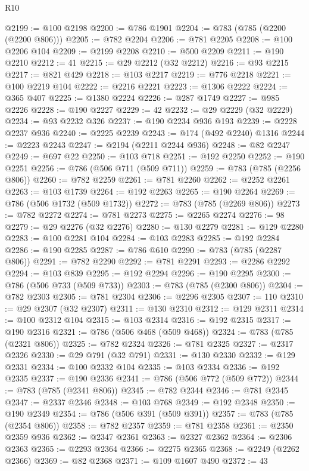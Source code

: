 \begin{lexlean}{R10}
\begin{coremodule}
@2199 := @100 @2198
@2200 := @786 @1901
@2204 := @783 (@785 (@2200 (@2200 @806)))
@2205 := @782 @2204
@2206 := @781 @2205
@2208 := @100 @2206 @104
@2209 := @2199 @2208
@2210 := @500 @2209
@2211 := @190 @2210
@2212 := 41
@2215 := @29 @2212 (@32 @2212)
@2216 := @93 @2215
@2217 := @821 @429
@2218 := @103 @2217
@2219 := @776 @2218
@2221 := @100 @2219 @104
@2222 := @2216 @2221
@2223 := @1306 @2222
@2224 := @365 @407
@2225 := @1380 @2224
@2226 := @287 @1749
@2227 := @985 @2226
@2228 := @190 @2227
@2229 := 42
@2232 := @29 @2229 (@32 @2229)
@2234 := @93 @2232 @326
@2237 := @190 @2234 @936 @193
@2239 := @2228 @2237 @936
@2240 := @2225 @2239
@2243 := @174 (@492 @2240) @1316
@2244 := @2223 @2243
@2247 := @2194 (@2211 @2244 @936)
@2248 := @82 @2247
@2249 := @697 @22
@2250 := @103 @718
@2251 := @192 @2250
@2252 := @190 @2251
@2256 := @786 (@506 @711 (@509 @711))
@2259 := @783 (@785 (@2256 @806))
@2260 := @782 @2259
@2261 := @781 @2260
@2262 := @2252 @2261
@2263 := @103 @1739
@2264 := @192 @2263
@2265 := @190 @2264
@2269 := @786 (@506 @1732 (@509 @1732))
@2272 := @783 (@785 (@2269 @806))
@2273 := @782 @2272
@2274 := @781 @2273
@2275 := @2265 @2274
@2276 := 98
@2279 := @29 @2276 (@32 @2276)
@2280 := @130 @2279
@2281 := @129 @2280
@2283 := @100 @2281 @104
@2284 := @103 @2283
@2285 := @192 @2284
@2286 := @190 @2285
@2287 := @786 @610
@2290 := @783 (@785 (@2287 @806))
@2291 := @782 @2290
@2292 := @781 @2291
@2293 := @2286 @2292
@2294 := @103 @839
@2295 := @192 @2294
@2296 := @190 @2295
@2300 := @786 (@506 @733 (@509 @733))
@2303 := @783 (@785 (@2300 @806))
@2304 := @782 @2303
@2305 := @781 @2304
@2306 := @2296 @2305
@2307 := 110
@2310 := @29 @2307 (@32 @2307)
@2311 := @130 @2310
@2312 := @129 @2311
@2314 := @100 @2312 @104
@2315 := @103 @2314
@2316 := @192 @2315
@2317 := @190 @2316
@2321 := @786 (@506 @468 (@509 @468))
@2324 := @783 (@785 (@2321 @806))
@2325 := @782 @2324
@2326 := @781 @2325
@2327 := @2317 @2326
@2330 := @29 @791 (@32 @791)
@2331 := @130 @2330
@2332 := @129 @2331
@2334 := @100 @2332 @104
@2335 := @103 @2334
@2336 := @192 @2335
@2337 := @190 @2336
@2341 := @786 (@506 @772 (@509 @772))
@2344 := @783 (@785 (@2341 @806))
@2345 := @782 @2344
@2346 := @781 @2345
@2347 := @2337 @2346
@2348 := @103 @768
@2349 := @192 @2348
@2350 := @190 @2349
@2354 := @786 (@506 @391 (@509 @391))
@2357 := @783 (@785 (@2354 @806))
@2358 := @782 @2357
@2359 := @781 @2358
@2361 := @2350 @2359 @936
@2362 := @2347 @2361
@2363 := @2327 @2362
@2364 := @2306 @2363
@2365 := @2293 @2364
@2366 := @2275 @2365
@2368 := @2249 (@2262 @2366)
@2369 := @82 @2368
@2371 := @109 @1607 @490
@2372 := 43

\end{coremodule}
\end{lexlean}
